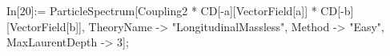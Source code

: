 In[20]:= ParticleSpectrum[Coupling2 * CD[-a][VectorField[a]] * CD[-b][VectorField[b]], TheoryName -> "LongitudinalMassless", Method -> "Easy", MaxLaurentDepth -> 3]; 